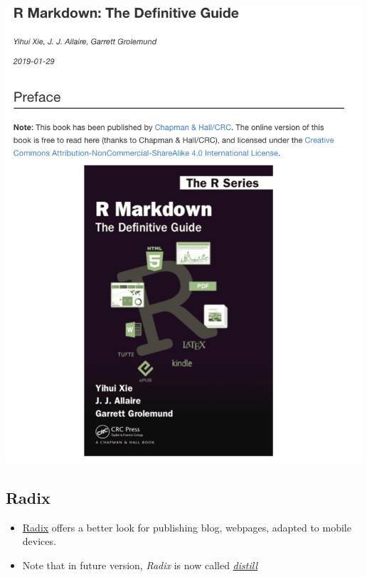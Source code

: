 \documentclass[]{article}
\begin{document}
\includegraphics[width=5.20833in,height=\textheight]{../figures/rmarkdown.png}

\hypertarget{radix}{%
\subsection{Radix}\label{radix}}

\begin{itemize}
\item
  \href{https://blog.rstudio.com/2018/09/19/radix-for-r-markdown/}{Radix}
  offers a better look for publishing blog, webpages, adapted to mobile
  devices.
\item
  Note that in future version, \emph{Radix} is now called
  \href{https://github.com/rstudio/distill}{\emph{distill}}
\end{itemize}
\end{document}
